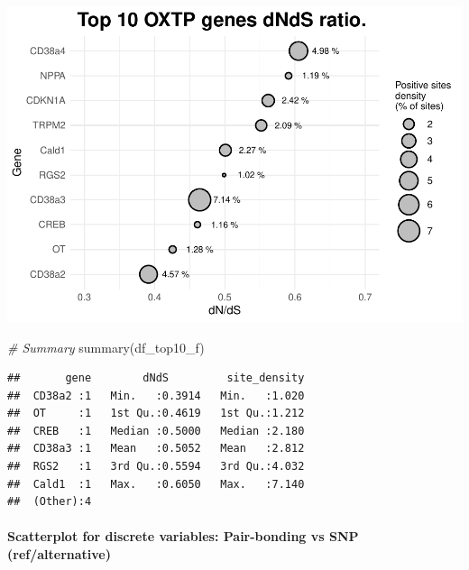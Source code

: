 \documentclass[
]{article}
\newenvironment{Shaded}{\begin{snugshade}}{\end{snugshade}}
\newcommand{\CommentTok}[1]{\textcolor[rgb]{0.56,0.35,0.01}{\textit{#1}}}
\newcommand{\FunctionTok}[1]{\textcolor[rgb]{0.00,0.00,0.00}{#1}}
\newcommand{\NormalTok}[1]{#1}
\begin{document}
\includegraphics{RMD_file_files/figure-latex/unnamed-chunk-7-1.pdf}

\begin{Shaded}
\begin{Highlighting}[]
\CommentTok{\# Summary}
\FunctionTok{summary}\NormalTok{(df\_top10\_f)}
\end{Highlighting}
\end{Shaded}

\begin{verbatim}
##       gene        dNdS         site_density  
##  CD38a2 :1   Min.   :0.3914   Min.   :1.020  
##  OT     :1   1st Qu.:0.4619   1st Qu.:1.212  
##  CREB   :1   Median :0.5000   Median :2.180  
##  CD38a3 :1   Mean   :0.5052   Mean   :2.812  
##  RGS2   :1   3rd Qu.:0.5594   3rd Qu.:4.032  
##  Cald1  :1   Max.   :0.6050   Max.   :7.140  
##  (Other):4
\end{verbatim}

\hypertarget{scatterplot-for-discrete-variables-pair-bonding-vs-snp-refalternative}{%
\paragraph{\texorpdfstring{\textbf{Scatterplot for discrete variables:
Pair-bonding vs SNP
(ref/alternative)}}{Scatterplot for discrete variables: Pair-bonding vs SNP (ref/alternative)}}\label{scatterplot-for-discrete-variables-pair-bonding-vs-snp-refalternative}}
\end{document}
